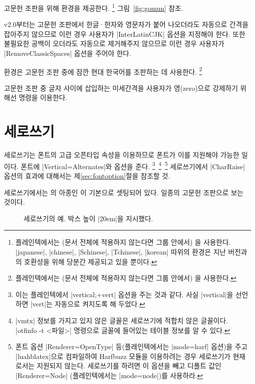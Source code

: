 \documentclass[a4paper]{article}
\def\luatex{\hologo{LuaTeX}}
\def\logoko{\textsf{k}\kern-.0625em\textit{o}}
\def\luatexko{\luatex-\logoko}
\begin{document}
고문헌 조판을 위해  환경을 제공한다.%
\footnote{%
  플레인텍에서는 (문서 전체에 적용하지 않는다면 그룹 안에서)
  을 사용한다.
  |japanese|, |chinese|, |Schinese|, |Tchinese|, |korean| 따위의 환경은
  지난 버전과의 호환성을 위해 당분간 제공되고 있을 뿐이다. }
그림~\ref{fig:gomun} 참조.

v2.0부터는 고문헌 조판에서 한글^^b7한자와 영문자가 붙어 나오더라도 자동으로
간격을 잡아주지 않으므로 이런 경우 사용자가 |InterLatinCJK| 옵션을
지정해야 한다.
또한 불필요한 공백이 오더라도 자동으로 제거해주지 않으므로 이런 경우
사용자가 |RemoveClassicSpaces| 옵션을 주어야 한다.

 환경은 고문헌 조판 중에 잠깐 현대 한국어를 조판하는 데
사용한다.%
\footnote{%
  플레인텍에서는 (문서 전체에 적용하지 않는다면 그룹 안에서)
  을 사용한다. }

고문헌 조판 중  글자 사이에 삽입하는 미세간격을 사용자가
영{\small(zero)}으로 강제하기 위해선 \pkgkwd{\inhibitglue} 명령을 이용한다.

\section{세로쓰기}\label{sec:verttype}

세로쓰기는 폰트의 고급 오픈타입 속성을 이용하므로 폰트가 이를 지원해야
가능한 일이다. 폰트에 |Vertical=Alternates|와 
옵션을 준다.%
\footnote{%
  이는 플레인텍에서 |vertical;+vert| 옵션을 주는 것과 같다.
  사실 |vertical|을 선언하면 |vert|는 자동으로 켜지도록 해 두었다. }\,%
\footnote{%
  |vmtx| 정보를 가지고 있지 않은 글꼴은 세로쓰기에 적합치 않은 글꼴이다.
  |otfinfo -t <파일>| 명령으로 글꼴에 들어있는 테이블 정보를 알 수 있다. }\,%
\footnote{%
  폰트 옵션 |Renderer=OpenType| 등(플레인텍에서는 |mode=harf| 옵션)을 주고
  |luahblatex|으로 컴파일하여 Harfbuzz 모듈을 이용하려는 경우 세로쓰기가
  현재로서는 지원되지 않는다. 세로쓰기를 하려면 이 옵션을 빼고 디폴트 값인
  |Renderer=Node| (플레인텍에서는 |mode=node|)를 사용하라.}
세로쓰기에서 |CharRaise| 옵션의 효과에 대해서는 제\ref{sec:fontoption}절을
참조할 것.

세로쓰기에서는 의 아종인 이
기본으로 셋팅되어 있다. 일종의 고문헌 조판으로 보는 것이다.

\begin{figure}
\caption{세로쓰기의 예. 박스 높이 |20em|을 지시했다.}\label{fig:vertical}
\end{figure}
\end{document}

